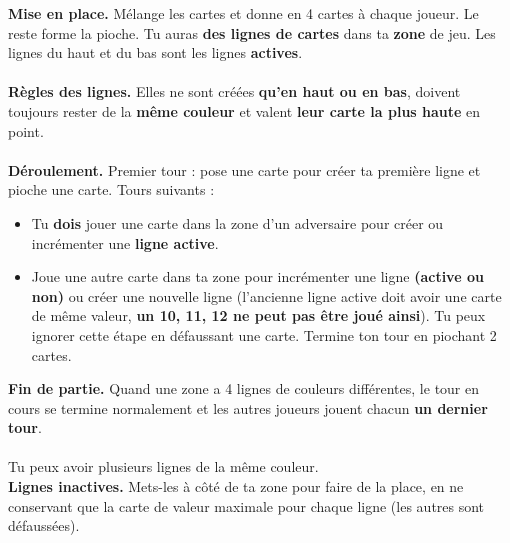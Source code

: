 \documentclass[a4paper]{memoir}
\begin{document}
{\footnotesize

\noindent
\textbf{ Mise en place.} Mélange les cartes et donne en 4 cartes à chaque joueur. 
Le reste forme la pioche. Tu auras \textbf{des lignes de cartes} dans ta \textbf{zone} de jeu.
Les lignes du haut et du bas sont les lignes \textbf{actives}.
\\
\\
\textbf{ Règles des lignes.} Elles ne sont créées \textbf{qu'en haut ou en bas}, 
doivent toujours rester de la \textbf{même couleur} et valent \textbf{leur carte la plus haute} en point.
\\
\\
\noindent
\textbf{ Déroulement.}  
Premier tour : pose une carte pour créer ta première ligne et pioche une carte. 
Tours suivants :
\begin{itemize}
    \item {} Tu \textbf{dois} jouer une carte dans la zone d’un adversaire pour créer ou incrémenter une \textbf{ligne active}.
    \item {} Joue une autre carte dans ta zone pour incrémenter une ligne \textbf{(active ou non)} ou créer une nouvelle ligne
    (l'ancienne ligne active doit avoir une carte de même valeur, \textbf{un 10, 11, 12 ne peut pas être joué ainsi}). Tu peux ignorer cette étape en défaussant une carte. Termine ton tour en piochant 2 cartes.
\end{itemize} 
\textbf{ Fin de partie.}
Quand une zone a 4 lignes de couleurs différentes, le tour en cours se termine normalement et les autres joueurs jouent chacun \textbf{un dernier tour}.
\\
\\
\noindent
{} Tu peux avoir plusieurs lignes de la même couleur.
\\
\textbf{ Lignes inactives.} Mets-les à côté de ta zone pour faire de la place, en ne conservant que la carte de valeur maximale pour chaque ligne (les autres sont défaussées).
}
\end{document}
